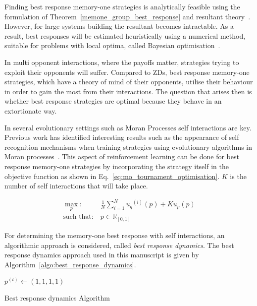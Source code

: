 \documentclass[10pt]{article}
\newcommand{\R}{\mathbb{R}}
\begin{document}
Finding best response memory-one strategies is analytically feasible using the
formulation of Theorem~\ref{memone_group_best_response} and resultant
theory~\cite{Jonsson2005}. However, for large systems building the resultant
becomes intractable. As a result, best responses will be estimated
heuristically using a numerical method, suitable for problems with local optima,
called Bayesian optimisation~\cite{Mokus1978}.

In multi opponent interactions,
where the payoffs matter, strategies trying to exploit their opponents will
suffer.
Compared to ZDs, best response memory-one strategies, which have a
theory of mind of their opponents, utilise their behaviour in order to gain the
most from their interactions. The question that arises then is whether best
response strategies are optimal because they behave in an extortionate way.

In several evolutionary settings
such as Moran Processes self interactions are key. Previous work has
identified interesting results such as the appearance of self recognition
mechanisms when training strategies using evolutionary algorithms in Moran
processes~\cite{Knight2018}. This aspect of reinforcement learning can be done for
best response memory-one strategies by incorporating the strategy itself in the
objective function as shown in Eq.~\ref{eq:mo_tournament_optimisation}.
\(K\) is the number of self interactions that will take place.

\begin{equation}\label{eq:mo_evolutionary_optimisation}
\begin{aligned}
\max_p: & \ \frac{1}{N} \sum\limits_{i=1} ^ {N} {u_q}^{(i)} (p) + Ku_p(p)
\\
\text{such that}: & \ p \in \R_{[0, 1]}
\end{aligned}
\end{equation}

For determining the memory-one best response with self interactions, an
algorithmic approach is considered, called \textit{best response dynamics}. The
best response dynamics approach used in this manuscript is given by
Algorithm~\ref{algo:best_response_dynamics}.

\begin{center}
\begin{minipage}{.55\textwidth}
\begin{algorithm}[H]
       $p^{(t)}\leftarrow (1, 1, 1, 1)$\;
       \caption{Best response dynamics Algorithm}
       \label{algo:best_response_dynamics}
\end{algorithm}
\end{minipage}
\end{center}
\end{document}
